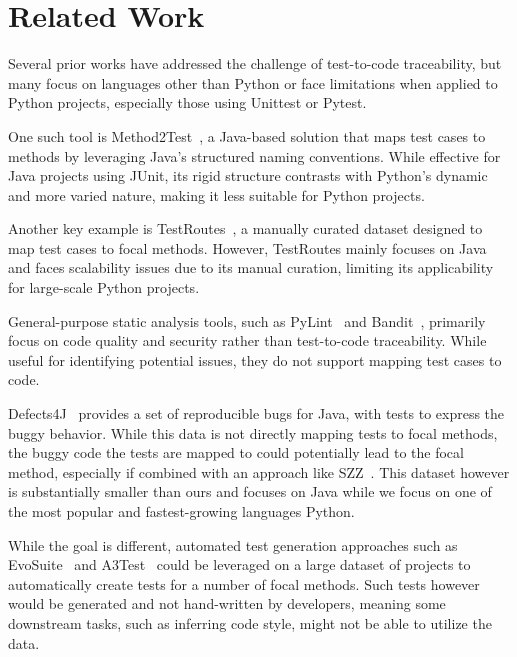 \section{Related Work}
Several prior works have addressed the challenge of test-to-code traceability, but many focus on languages other than Python or face limitations when applied to Python projects, especially those using Unittest or Pytest.

One such tool is Method2Test~\cite{tufano2022methods2test}, a Java-based solution that maps test cases to methods by leveraging Java’s structured naming conventions. While effective for Java projects using JUnit, its rigid structure contrasts with Python’s dynamic and more varied nature, making it less suitable for Python projects.

Another key example is TestRoutes~\cite{kicsi2020testroutes}, a manually curated dataset designed to map test cases to focal methods. However, TestRoutes mainly focuses on Java and faces scalability issues due to its manual curation, limiting its applicability for large-scale Python projects.

General-purpose static analysis tools, such as PyLint~\cite{pylint} and Bandit~\cite{bandit}, primarily focus on code quality and security rather than test-to-code traceability. While useful for identifying potential issues, they do not support mapping test cases to code.

Defects4J~\cite{defects4j} provides a set of reproducible bugs for Java, with tests to express the buggy behavior.  While this data is not directly mapping tests to focal methods, the buggy code the tests are mapped to could potentially lead to the focal method, especially if combined with an approach like SZZ~\cite{szz}.  This dataset however is substantially smaller than ours and focuses on Java while we focus on one of the most popular and fastest-growing languages Python.

While the goal is different, automated test generation approaches such as EvoSuite~\cite{evosuite} and A3Test~\cite{alagarsamy2024a3test} could be leveraged on a large dataset of projects to automatically create tests for a number of focal methods.  Such tests however would be generated and not hand-written by developers, meaning some downstream tasks, such as inferring code style, might not be able to utilize the data.
